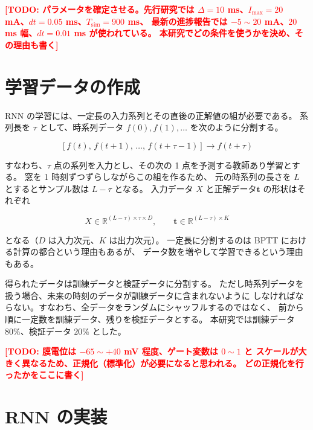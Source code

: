 \documentclass[a4paper,11pt,openany]{ltjsreport}
\newcommand{\TODO}[1]{\textcolor{red}{\textbf{[TODO: #1]}}}
\begin{document}
\TODO{パラメータを確定させる。先行研究\cite{munechika2025}では
      $\Delta = 10$ ms、$I_{\max} = 20$ mA、$dt = 0.05$ ms、$T_{\mathrm{sim}} = 900$ ms、
      最新の進捗報告では $-5 \sim 20$ mA、$20$ ms 幅、$dt = 0.01$ ms が使われている。
      本研究でどの条件を使うかを決め、その理由も書く}

\section{学習データの作成}
\label{sec:dataset}

RNN の学習には、一定長の入力系列とその直後の正解値の組が必要である。
系列長を $\tau$ として、時系列データ $f(0), f(1), \dots$ を次のように分割する。

\begin{equation}
  \left[ f(t),\, f(t+1),\, \dots,\, f(t+\tau-1) \right] \longrightarrow f(t+\tau)
  \label{eq:window}
\end{equation}

すなわち、$\tau$ 点の系列を入力とし、その次の 1 点を予測する教師あり学習とする。
窓を 1 時刻ずつずらしながらこの組を作るため、
元の時系列の長さを $L$ とするとサンプル数は $L - \tau$ となる。
入力データ $X$ と正解データ$\bm{t}$ の形状はそれぞれ

\begin{equation}
  X \in \mathbb{R}^{(L-\tau) \times \tau \times D}, \qquad
  \bm{t} \in \mathbb{R}^{(L-\tau) \times K}
  \label{eq:shapes}
\end{equation}

となる（$D$ は入力次元、$K$ は出力次元）。
一定長に分割するのは BPTT における計算の都合という理由もあるが、
データ数を増やして学習できるという理由もある\cite{sugomori2019}。

得られたデータは訓練データと検証データに分割する。
ただし時系列データを扱う場合、未来の時刻のデータが訓練データに含まれないように
しなければならない。すなわち、全データをランダムにシャッフルするのではなく、
前から順に一定数を訓練データ、残りを検証データとする。
本研究では訓練データ $80\%$、検証データ $20\%$ とした。

\TODO{膜電位は $-65 \sim +40$ mV 程度、ゲート変数は $0 \sim 1$ と
      スケールが大きく異なるため、正規化（標準化）が必要になると思われる。
      どの正規化を行ったかをここに書く}

\section{RNN の実装}
\label{sec:rnn_impl}
\end{document}
